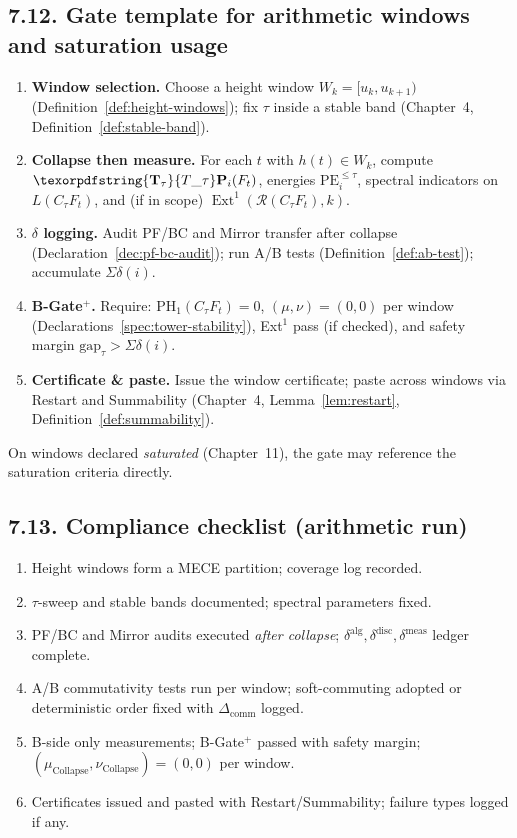\documentclass[11pt]{article}
\numberwithin{equation}{section}
\theoremstyle{plain}
\theoremstyle{definition}
\theoremstyle{remark}
\DeclareMathOperator{\Ext}{Ext}
\DeclareRobustCommand{\hyp}{\nobreakdash-}
\newcommand{\Rfun}{\mathcal{R}}
\theoremstyle{plain}
\theoremstyle{definition}
\numberwithin{equation}{section}
\theoremstyle{definition}
\DeclareRobustCommand{\Ttau}{\texorpdfstring{\ensuremath{\mathbf{T}_{\tau}}}{T\_\tau}}
\DeclareRobustCommand{\muc}{\mu_{\mathrm{Collapse}}}
\DeclareRobustCommand{\nuc}{\nu_{\mathrm{Collapse}}}
\numberwithin{equation}{section}
\theoremstyle{plain}
\theoremstyle{definition}
\theoremstyle{remark}
\providecommand{\Tfun}[1]{\mathbf{T}_{#1}}
\providecommand{\Ttau}{\Tfun{\tau}}
\providecommand{\muc}{\mu_{\mathrm{Collapse}}}
\providecommand{\nuc}{\nu_{\mathrm{Collapse}}}
\begin{document}
\subsection*{7.12. Gate template for arithmetic windows and saturation usage}
\begin{enumerate}
  \item \textbf{Window selection.} Choose a height window \(W_k=[u_k,u_{k+1})\) (Definition~\ref{def:height-windows}); fix \(\tau\) inside a stable band (Chapter~4, Definition~\ref{def:stable-band}).
  \item \textbf{Collapse then measure.} For each \(t\) with \(h(t)\in W_k\), compute \(\Ttau\mathbf{P}_i(F_t)\), energies \(\mathrm{PE}_i^{\le\tau}\), spectral indicators on \(L(C_\tau F_t)\), and (if in scope) \(\Ext^1(\Rfun(C_\tau F_t),k)\).
  \item \textbf{$\delta$ logging.} Audit PF/BC and Mirror transfer after collapse (Declaration~\ref{dec:pf-bc-audit}); run A/B tests (Definition~\ref{def:ab-test}); accumulate \(\Sigma\delta(i)\).
  \item \textbf{B\hyp Gate$^{+}$.} Require: \(\mathrm{PH}_1(C_\tau F_t)=0\), \((\mu,\nu)=(0,0)\) per window (Declarations~\ref{spec:tower-stability}), Ext\(^1\) pass (if checked), and safety margin \(\mathrm{gap}_\tau>\Sigma\delta(i)\).
  \item \textbf{Certificate \& paste.} Issue the window certificate; paste across windows via Restart and Summability (Chapter~4, Lemma~\ref{lem:restart}, Definition~\ref{def:summability}).
\end{enumerate}
On windows declared \emph{saturated} (Chapter~11), the gate may reference the saturation criteria directly.

\subsection*{7.13. Compliance checklist (arithmetic run)}
\begin{enumerate}
  \item Height windows form a MECE partition; coverage log recorded.
  \item \(\tau\)\hyp sweep and stable bands documented; spectral parameters fixed.
  \item PF/BC and Mirror audits executed \emph{after collapse}; \(\delta^{\mathrm{alg}},\delta^{\mathrm{disc}},\delta^{\mathrm{meas}}\) ledger complete.
  \item A/B commutativity tests run per window; soft\hyp commuting adopted or deterministic order fixed with \(\Delta_{\mathrm{comm}}\) logged.
  \item B\hyp side only measurements; B\hyp Gate$^{+}$ passed with safety margin; \((\muc,\nuc)=(0,0)\) per window.
  \item Certificates issued and pasted with Restart/Summability; failure types logged if any.
\end{enumerate}
\end{document}
